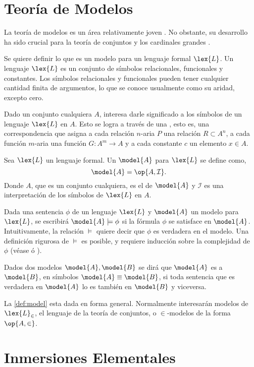 \section{Teoría de Modelos}
\label{sec:models}

La teoría de modelos es un área relativamente joven \autocite[pág. 3]{chang_model_2012}.
No obstante, su desarrollo ha sido crucial para la teoría de conjuntos y los
cardinales grandes \autocite[pág. xv]{kanamori_higher_2009}.

Se quiere definir lo que es un modelo para un lenguaje formal $\lex{L}$.
Un lenguaje $\lex{L}$ es un conjunto de símbolos relacionales, funcionales y constantes.
Los símbolos relacionales y funcionales pueden tener cualquier cantidad finita de argumentos,
lo que se conoce usualmente como su aridad, excepto cero.

Dado un conjunto cualquiera $A$, interesa darle significado a los símbolos de un
lenguaje $\lex{L}$ en $A$. Esto se logra a través de una , esto es,
una correspondencia que asigna a cada relación $n$-aria $P$ una relación
$R\subset A^n$, a cada función $m$-aria una función $G\colon A^m\to A$ y a cada
constante $c$ un elemento $x\in A$.

\begin{defi}\label{def:model}
    Sea $\lex{L}$ un lenguaje formal. Un  $\model{A}$ para $\lex{L}$ se define como,
    \[
        \model{A} = \op{A, \mathcal{I}}.
    \]
    Donde $A$, que es un conjunto cualquiera, es el  de $\model{A}$ y
    $\mathcal{I}$ es una interpretación de los símbolos de $\lex{L}$ en $A$.
\end{defi}

Dada una sentencia $\phi$ de un lenguaje $\lex{L}$ y $\model{A}$ un modelo para $\lex{L}$,
se escribirá $\model{A}\models\phi$ si la fórmula $\phi$ se satisface en $\model{A}$.
Intuitivamente, la relación $\models$ quiere decir que $\phi$ es verdadera en el modelo.
Una definición rigurosa de $\models$ es posible, y requiere inducción sobre la complejidad
de $\phi$ (véase \autocite[\S 1.3]{chang_model_2012} ó \autocite[\S 12]{jech_set_2003}).

Dados dos modelos $\model{A}, \model{B}$ se dirá que $\model{A}$ es  a $\model{B}$, en símbolos $\model{A}\equiv \model{B}$, si toda sentencia
que es verdadera en $\model{A}$ lo es también en $\model{B}$ y viceversa.

La \cref{def:model} esta dada en forma general. Normalmente interesarán modelos de $\lex{L}_\in$,
el lenguaje de la teoría de conjuntos, o $\in$-modelos de la forma $\op{A,\in}$.

\section{Inmersiones Elementales}
\label{sec:elem-embed}
